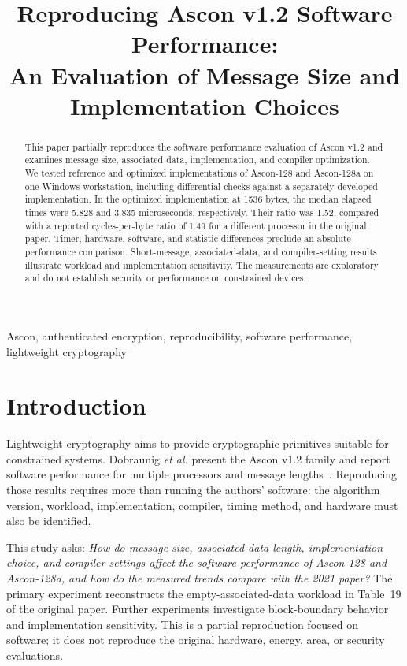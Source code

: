 \documentclass[conference]{IEEEtran}
\title{Reproducing Ascon v1.2 Software Performance:\\
An Evaluation of Message Size and Implementation Choices}
\author{\IEEEauthorblockN{Author name}
\IEEEauthorblockA{Institution\\
Email address}}
\begin{document}
\maketitle

\begin{abstract}
This paper partially reproduces the software performance evaluation of
Ascon v1.2 and examines message size, associated data, implementation, and
compiler optimization. We tested reference and optimized implementations of
Ascon-128 and Ascon-128a on one Windows workstation, including differential
checks against a separately developed implementation. In the optimized
implementation at 1536 bytes, the median elapsed times were 5.828 and
3.835 microseconds, respectively. Their ratio was 1.52, compared with a
reported cycles-per-byte ratio of 1.49 for a different processor in the
original paper. Timer, hardware, software, and statistic differences preclude
an absolute performance comparison. Short-message, associated-data, and
compiler-setting results illustrate workload and implementation sensitivity.
The measurements are exploratory and do not establish security or performance
on constrained devices.
\end{abstract}

\begin{IEEEkeywords}
Ascon, authenticated encryption, reproducibility, software performance,
lightweight cryptography
\end{IEEEkeywords}

\section{Introduction}
Lightweight cryptography aims to provide cryptographic primitives suitable for
constrained systems. Dobraunig \emph{et al.} present the Ascon v1.2 family and
report software performance for multiple processors and message
lengths~\cite{ascon2021}. Reproducing those results requires more than running
the authors' software: the algorithm version, workload, implementation,
compiler, timing method, and hardware must also be identified.

This study asks: \emph{How do message size, associated-data length,
implementation choice, and compiler settings affect the software performance
of Ascon-128 and Ascon-128a, and how do the measured trends compare with the
2021 paper?} The primary experiment reconstructs the empty-associated-data
workload in Table~19 of the original paper. Further experiments investigate
block-boundary behavior and implementation sensitivity. This is a partial
reproduction focused on software; it does not reproduce the original hardware,
energy, area, or security evaluations.
\end{document}
